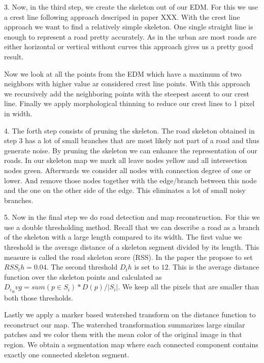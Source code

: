 \documentclass[10pt,conference,compsocconf]{IEEEtran}
\begin{document}
3. Now, in the third step, we create the skeleton out of our EDM. For this we use a crest line following approach descriped in paper XXX. With the crest line approach we want to find a relatively simple skeleton. One single straight line is enough to represent a road pretty accurately. As in the urban are most roads are either horizontal or vertical without curves this approach gives us a pretty good result. 

Now we look at all the points from the EDM which have a maximum of two neighbors with higher value ar considered crest line points. With this approach we recursively add the neighboring points with the steepest ascent to our crest line. Finally we apply morphological thinning to reduce our crest lines to 1 pixel in width.

4. The forth step consists of pruning the skeleton. The road skeleton obtained in step 3 has a lot of small branches that are most likely not part of a road and thus generate noise. By pruning the skeleton we can enhance the representation of our roads. In our skeleton map we mark all leave nodes yellow and all intersection nodes green. Afterwards we consider all nodes with connection degree of one or lower. And remove those nodes together with the edge/branch between this node and the one on the other side of the edge. This eliminates a lot of small noisy branches. 


5. Now in the final step we do road detection and map reconstruction. For this we use a double thresholding method. Recall that we can describe a road as a branch of the skeleton with a large length compared to its width. The first value we threshold is the average distance of a skeleton segment divided by its length. This measure is called the road skeleton score (RSS). In the paper the propose to set $RSS_th = 0.04$. The second threshold $D_th$ is set to $12$. This is the average distance function over the skeleton points and calculated as ${D_i}_avg = sum(p \in S_i) * D(p) / |S_i|$. We keep all the pixels that are smaller than both those thresholds. 

Lastly we apply a marker based watershed transform on the distance function to reconstruct our map. The watershed transformation summarizes large similar patches and we color them with the mean color of the original image in that region. We obtain a segmentation map where each connected component contains exactly one connected skeleton segment. 
\end{document}
